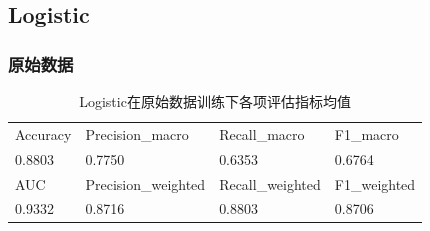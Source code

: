 \documentclass[10pt]{article}
\begin{document}
\subsection{Logistic}
\subsubsection*{原始数据}
\begin{table}[H]
  \centering
  \caption{Logistic在原始数据训练下各项评估指标均值}
  \begin{tabular}{llll}
  \toprule
  Accuracy & Precision\_macro & Recall\_macro & F1\_macro \\
  0.8803 & 0.7750 & 0.6353 & 0.6764 \\
  \midrule
  AUC & Precision\_weighted & Recall\_weighted & F1\_weighted \\
  0.9332 & 0.8716 & 0.8803 & 0.8706 \\
  \bottomrule
  \end{tabular}
\end{table}
\end{document}
